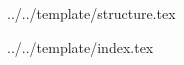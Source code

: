 


\def\DOCUMENTO{}
\def\VERSIONE{}

\def\DESCRIZIONE{}

\def\REDATTORE {}
\def\VERIFICATORE {}
\def\RESPONSABILE {}

\def\USO {}

\def\DISTRIBUZIONE {\GRUPPO{}\\ & \COMMITTENTE{}\\}


\def\INDICE	{false}
\def\TABELLE {false}
\def\FIGURE {false}


 {../../template/structure.tex}


 {../../template/index.tex}









